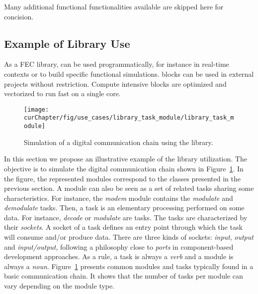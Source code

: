 Many additional functional functionalities available are skipped here for
concision.

\subsection{Example of Library Use}
\label{sec:aff3ct_library_example}

As a FEC library, \AFFECT can be used programmatically, for instance in
real-time contexts or to build specific functional simulations. \AFFECT blocks
can be used in external projects without restriction. Compute intensive blocks
are optimized and vectorized to run fast on a single core.


\begin{figure}[htp]
  \centering
  \texttt{[image: \\curChapter/fig/use\_cases/library\_task\_module/library\_task\_module]}
  \caption{Simulation of a digital communication chain using the \AFFECT
    library.}
  \label{fig:aff3ct_library_task_module}
\end{figure}

In this section we propose an illustrative example of the \AFFECT library
utilization. The objective is to simulate the digital communication chain shown
in Figure~\ref{fig:aff3ct_library_task_module}. In the figure, the represented
modules correspond to the classes presented in the previous section. A module
can also be seen as a set of related tasks sharing some characteristics. For
instance, the \textit{modem} module contains the \textit{modulate} and
\textit{demodulate} tasks. Then, a task is an elementary processing performed on
some data. For instance, \textit{decode} or \textit{modulate} are tasks. The
tasks are characterized by their \textit{sockets}. A socket of a task defines an
entry point through which the task will consume and/or produce data. There are
three kinds of sockets: \textit{input}, \textit{output} and
\textit{input/output}, following a philosophy close to \emph{ports} in
component-based development approaches. As a rule, a task is always a
\emph{verb} and a module is always a \emph{noun}.
Figure~\ref{fig:aff3ct_library_task_module} presents common modules and tasks
typically found in a basic communication chain. It shows that the number of
tasks per module can vary depending on the module type.


